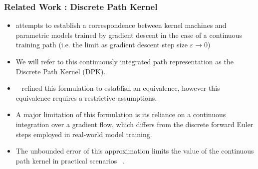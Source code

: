   \begin{frame}
    \frametitle{Related Work : Discrete Path Kernel}
    \begin{itemize}
      \item \citet{domingos2020} attempts to establish a correspondence between kernel machines and parametric models trained by gradient descent in the case of a continuous training path (i.e. the limit as gradient descent step size $\varepsilon \to 0$)
      \item We will refer to this continuously integrated path
        representation as the Discrete Path Kernel (DPK).
\item ~\citet{chen2021equivalence} refined this formulation to
  establish an equivalence, however this equivalence requires a
  restrictive assumptions. 
\item A major limitation of this formulation is its reliance on a
  continuous integration over a gradient flow, which differs from the
  discrete forward Euler steps employed in real-world model training.
  \item The unbounded error of this approximation limits the
    value of the continuous path kernel in practical scenarios ~\citep{incudini2022quantum}.
\end{itemize}
\end{frame}


